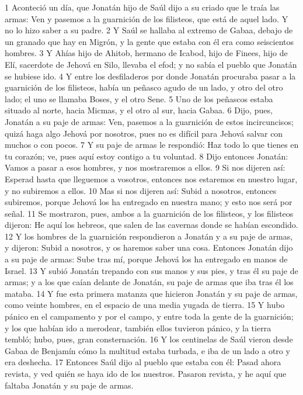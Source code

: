1 Aconteció un día, que Jonatán hijo de Saúl dijo a su criado que le traía las armas: Ven y pasemos a la guarnición de los filisteos, que está de aquel lado. Y no lo hizo saber a su padre.
2 Y Saúl se hallaba al extremo de Gabaa, debajo de un granado que hay en Migrón, y la gente que estaba con él era como seiscientos hombres.
3 Y Ahías hijo de Ahitob, hermano de Icabod, hijo de Finees, hijo de Elí, sacerdote de Jehová en Silo, llevaba el efod; y no sabía el pueblo que Jonatán se hubiese ido.
4 Y entre los desfiladeros por donde Jonatán procuraba pasar a la guarnición de los filisteos, había un peñasco agudo de un lado, y otro del otro lado; el uno se llamaba Boses, y el otro Sene.
5 Uno de los peñascos estaba situado al norte, hacia Micmas, y el otro al sur, hacia Gabaa.
6 Dijo, pues, Jonatán a su paje de armas: Ven, pasemos a la guarnición de estos incircuncisos; quizá haga algo Jehová por nosotros, pues no es difícil para Jehová salvar con muchos o con pocos.
7 Y su paje de armas le respondió: Haz todo lo que tienes en tu corazón; ve, pues aquí estoy contigo a tu voluntad.
8 Dijo entonces Jonatán: Vamos a pasar a esos hombres, y nos mostraremos a ellos.
9 Si nos dijeren así: Esperad hasta que lleguemos a vosotros, entonces nos estaremos en nuestro lugar, y no subiremos a ellos.
10 Mas si nos dijeren así: Subid a nosotros, entonces subiremos, porque Jehová los ha entregado en nuestra mano; y esto nos será por señal.
11 Se mostraron, pues, ambos a la guarnición de los filisteos, y los filisteos dijeron: He aquí los hebreos, que salen de las cavernas donde se habían escondido.
12 Y los hombres de la guarnición respondieron a Jonatán y a su paje de armas, y dijeron: Subid a nosotros, y os haremos saber una cosa. Entonces Jonatán dijo a su paje de armas: Sube tras mí, porque Jehová los ha entregado en manos de Israel.
13 Y subió Jonatán trepando con sus manos y sus pies, y tras él su paje de armas; y a los que caían delante de Jonatán, su paje de armas que iba tras él los mataba.
14 Y fue esta primera matanza que hicieron Jonatán y su paje de armas, como veinte hombres, en el espacio de una media yugada de tierra.
15 Y hubo pánico en el campamento y por el campo, y entre toda la gente de la guarnición; y los que habían ido a merodear, también ellos tuvieron pánico, y la tierra tembló; hubo, pues, gran consternación.
16 Y los centinelas de Saúl vieron desde Gabaa de Benjamín cómo la multitud estaba turbada, e iba de un lado a otro y era deshecha.
17 Entonces Saúl dijo al pueblo que estaba con él: Pasad ahora revista, y ved quién se haya ido de los nuestros. Pasaron revista, y he aquí que faltaba Jonatán y su paje de armas.
